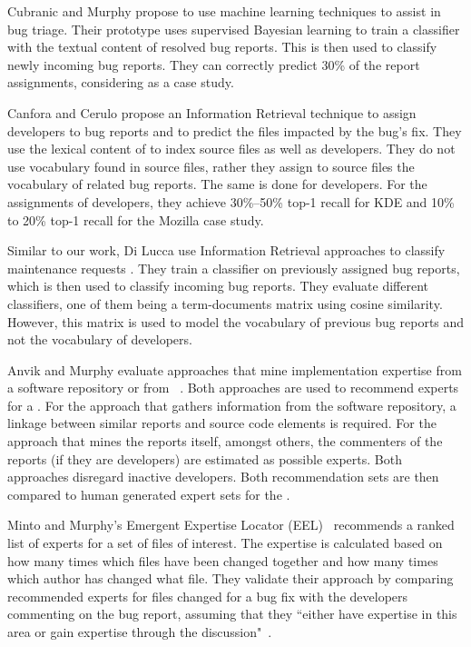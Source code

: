 Cubranic and Murphy \cite{Cubr04b} propose to use machine learning techniques to assist in bug triage. Their prototype uses supervised Bayesian learning to train a classifier with the textual content of resolved bug reports. This is then used to classify newly incoming bug reports. They can correctly predict 30\% of the report assignments, considering \EC as a case study.

Canfora and Cerulo \cite{Canf05a} propose an Information Retrieval technique to assign developers to bug reports and to predict the files impacted by the bug's fix. They use the lexical content of \BRs to index source files as well as developers. They do not use vocabulary found in source files, rather they assign to source files the vocabulary of related bug reports. The same is done for developers. For the assignments of developers, they achieve 30\%--50\% top-1 recall for KDE and 10\% to 20\% top-1 recall for the Mozilla case study.


Similar to our work, Di Lucca \etal use Information Retrieval approaches to classify maintenance requests \cite{Lucc02b}. They train a classifier on previously assigned bug reports, which is then used to classify incoming bug reports. They evaluate different classifiers, one of them being a term-documents matrix using cosine similarity. However, this matrix is used to model the vocabulary of previous bug reports and not the vocabulary of developers.

Anvik and Murphy evaluate approaches that mine implementation expertise from a software repository or from \BRs~\cite{Anvik07}. Both approaches are used to recommend experts for a \BR. For the approach that gathers information from the software repository, a linkage between similar reports and source code elements is required. For the approach that mines the reports itself, amongst others, the commenters of the reports (if they are developers) are estimated as possible experts. Both approaches disregard inactive developers. Both recommendation sets are then compared to human generated expert sets for the \BR.

Minto and Murphy's Emergent Expertise Locator (EEL)~\cite{Minto07} recommends a ranked list of experts for a set of files of interest. The expertise is calculated based on how many times which files have been changed together and how many times which author has changed what file. They validate their approach by comparing recommended experts for files changed for a bug fix with the developers commenting on the bug report, assuming that they ``either have expertise in this area or gain expertise through the discussion"~\cite{Minto07}.

